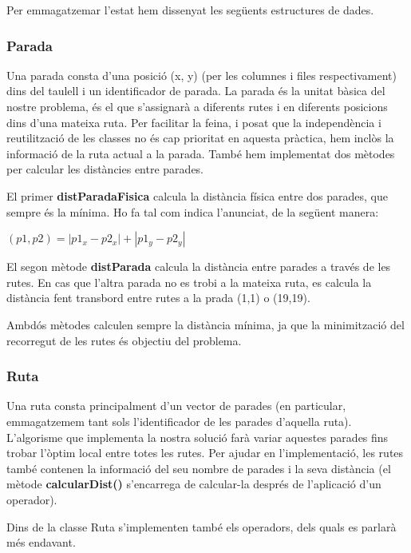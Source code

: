 Per emmagatzemar l'estat hem dissenyat les següents estructures de dades.

\subsubsection{Parada} %

Una parada consta d'una posició (x, y) (per les columnes i files respectivament) dins del taulell i un identificador de parada. La parada és la unitat bàsica del nostre problema, és el que s'assignarà a diferents rutes i en diferents posicions dins d'una mateixa ruta. Per facilitar la feina, i posat que la independència i reutilització de les classes no és cap prioritat en aquesta pràctica, hem inclòs la informació de la ruta actual a la parada. També hem implementat dos mètodes per calcular les distàncies entre parades. 

El primer \textbf{distParadaFisica} calcula la distància física entre dos parades, que sempre és la mínima. Ho fa tal com indica l'anunciat, de la següent manera:

\begin{center}
$(p1,p2)=|p1_{x} - p2_{x}|+|p1_{y} - p2_{y}|$ 
\end{center}

El segon mètode \textbf{distParada} calcula la distància entre parades a través de les rutes. En cas que l'altra parada no es trobi a la mateixa ruta, es calcula la distància fent transbord entre rutes a la prada (1,1) o (19,19).

Ambdós mètodes calculen sempre la distància mínima, ja que la minimització del recorregut de les rutes és objectiu del problema.

\subsubsection{Ruta} %

Una ruta consta principalment d'un vector de parades (en particular, emmagatzemem tant sols l'identificador de les parades d'aquella ruta). L'algorisme que implementa la nostra solució farà variar aquestes parades fins trobar l'òptim local entre totes les rutes. Per ajudar en l'implementació, les rutes també contenen la informació del seu nombre de parades i la seva distància (el mètode \textbf{calcularDist()} s'encarrega de calcular-la després de l'aplicació d'un operador).

Dins de la classe Ruta s'implementen també els operadors, dels quals es parlarà més endavant.

